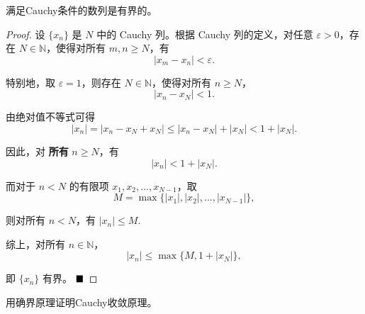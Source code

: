 \begin{proposition}\label{prop:cauchy_bounded}
    满足Cauchy条件的数列是有界的。
\end{proposition}
\begin{proof}
    设 $\{x_n\}$ 是 $N$ 中的 Cauchy 列。根据 Cauchy 列的定义，对任意 $\varepsilon > 0$，存在 $N \in \mathbb{N}$，使得对所有 $m, n \geq N$，有
    \[|x_m - x_n| < \varepsilon.\]
    
    特别地，取 $\varepsilon = 1$，则存在 $N \in \mathbb{N}$，使得对所有 $n \geq N$，
    \[|x_n - x_N| < 1.\]
    
    由绝对值不等式可得
    \[|x_n| = |x_n - x_N + x_N| \leq |x_n - x_N| + |x_N| < 1 + |x_N|.\]
    
    因此，对 \textbf{所有} $n \geq N$，有
    \[|x_n| < 1 + |x_N|.\]
    
    而对于 $n < N$ 的有限项 $x_1, x_2, \ldots, x_{N-1}$，取
    \[M = \max\{|x_1|, |x_2|, \ldots, |x_{N-1}|\},\]
    
    则对所有 $n < N$，有 $|x_n| \leq M$.
    
    综上，对所有 $n \in \mathbb{N}$，
    \[|x_n| \leq \max\{M, 1 + |x_N|\},\]
    
    即 $\{x_n\}$ 有界。 $\hfill\blacksquare$
    \end{proof}

\begin{problem}
    用确界原理证明Cauchy收敛原理。
\end{problem}

